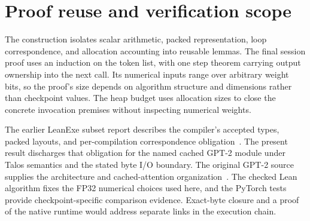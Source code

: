 \documentclass[11pt]{article}
\begin{document}
\section{Proof reuse and verification scope}

The construction isolates scalar arithmetic, packed representation, loop correspondence, and allocation accounting into reusable lemmas.  The final session proof uses an induction on the token list, with one step theorem carrying output ownership into the next call.  Its numerical inputs range over arbitrary weight bits, so the proof's size depends on algorithm structure and dimensions rather than checkpoint values.  The heap budget uses allocation sizes to close the concrete invocation premises without inspecting numerical weights.

The earlier LeanExe subset report describes the compiler's accepted types, packed layouts, and per-compilation correspondence obligation~\cite{subset}.  The present result discharges that obligation for the named cached GPT-2 module under Talos semantics and the stated byte I/O boundary.  The original GPT-2 source supplies the architecture and cached-attention organization~\cite{gpt2}.  The checked Lean algorithm fixes the FP32 numerical choices used here, and the PyTorch tests provide checkpoint-specific comparison evidence.  Exact-byte closure and a proof of the native runtime would address separate links in the execution chain.
\end{document}
